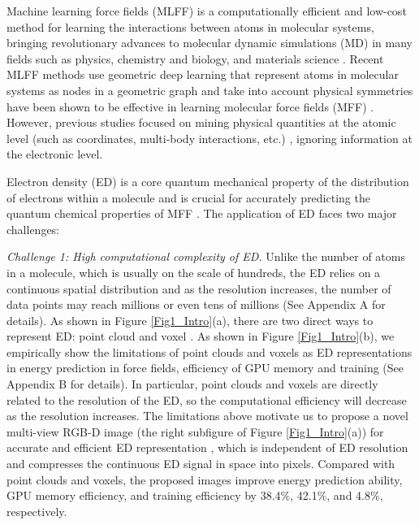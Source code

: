 \documentclass{article}
\begin{document}
Machine learning force fields (MLFF) is a computationally efficient and low-cost method for learning the interactions between atoms in molecular systems, bringing revolutionary advances to molecular dynamic simulations (MD) in many fields such as physics, chemistry and biology, and materials science \cite{chmiela2017machine,xiang2024molecular,wang2024efficiently}. Recent MLFF methods use geometric deep learning that represent atoms in molecular systems as nodes in a geometric graph and take into account physical symmetries have been shown to be effective in learning molecular force fields (MFF) \cite{liu2022spherical,wang2024enhancing}. However, previous studies focused on mining physical quantities at the atomic level (such as coordinates, multi-body interactions, etc.) \cite{batzner20223,liao2023equiformer,wang2024enhancing}, ignoring information at the electronic level.

Electron density (ED) is a core quantum mechanical property of the distribution of electrons within a molecule and is crucial for accurately predicting the quantum chemical properties of MFF \cite{sunshine2023chemical,skogh2024electron}. The application of ED faces two major challenges: 

\textit{Challenge 1: High computational complexity of ED.} Unlike the number of atoms in a molecule, which is usually on the scale of hundreds, the ED relies on a continuous spatial distribution and as the resolution increases, the number of data points may reach millions or even tens of millions (See Appendix A for details). As shown in Figure \ref{Fig1_Intro}(a), there are two direct ways to represent ED: point cloud \cite{guo2020deep} and voxel \cite{gong2023incorporation}. As shown in Figure \ref{Fig1_Intro}(b), we empirically show the limitations of point clouds and voxels as ED representations in energy prediction in force fields, efficiency of GPU memory and training (See Appendix B for details). In particular, point clouds and voxels are directly related to the resolution of the ED, so the computational efficiency will decrease as the resolution increases. The limitations above motivate us to propose a novel multi-view RGB-D image (the right subfigure of Figure \ref{Fig1_Intro}(a)) for accurate and efficient ED representation \cite{10.24963/ijcai.2024/675}, which is independent of ED resolution and compresses the continuous ED signal in space into pixels. Compared with point clouds and voxels, the proposed images improve energy prediction ability, GPU memory efficiency, and training efficiency by 38.4\%, 42.1\%, and 4.8\%, respectively.
\end{document}

